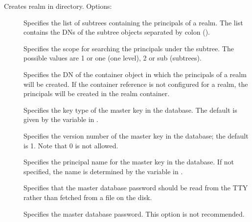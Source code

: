 \documentclass[letterpaper,10pt,english]{sphinxmanual}
\begin{document}
Creates realm in directory. Options:
\begin{description}
\item[{ }] \leavevmode
Specifies the list of subtrees containing the principals of a
realm.  The list contains the DNs of the subtree objects separated
by colon (\sphinxcode{:}).

\item[{ }] \leavevmode
Specifies the scope for searching the principals under the
subtree.  The possible values are 1 or one (one level), 2 or sub
(subtrees).

\item[{ }] \leavevmode
Specifies the DN of the container object in which the principals
of a realm will be created.  If the container reference is not
configured for a realm, the principals will be created in the
realm container.

\item[{ }] \leavevmode
Specifies the key type of the master key in the database.  The
default is given by the  variable in
{\hyperref[\detokenize{admin/conf_files/kdc_conf:kdc-conf-5}]{}}.

\item[{ }] \leavevmode
Specifies the version number of the master key in the database;
the default is 1.  Note that 0 is not allowed.

\item[{ }] \leavevmode
Specifies the principal name for the master key in the database.
If not specified, the name is determined by the
 variable in {\hyperref[\detokenize{admin/conf_files/kdc_conf:kdc-conf-5}]{}}.

\item[{}] \leavevmode
Specifies that the master database password should be read from
the TTY rather than fetched from a file on the disk.

\item[{ }] \leavevmode
Specifies the master database password. This option is not
recommended.


\end{description}
\end{document}
